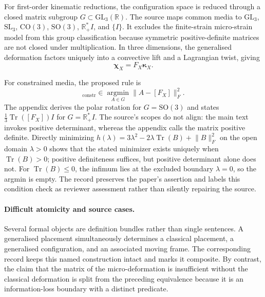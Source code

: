 For first-order kinematic reductions, the configuration space is reduced through a closed matrix subgroup $G\subset\mathrm{GL}_3(\mathbb R)$. The source maps common media to $\mathrm{GL}_3$, $\mathrm{SL}_3$, $\mathrm{CO}(3)$, $\mathrm{SO}(3)$, $\mathbb R_+^*I$, and $\{I\}$. It excludes the finite-strain micro-strain model from this group classification because symmetric positive-definite matrices are not closed under multiplication. In three dimensions, the generalised deformation factors uniquely into a convective lift and a Lagrangian twist, giving
\begin{equation}
\boldsymbol\chi_X=F_X\boldsymbol\kappa_X.
\end{equation}

For constrained media, the proposed rule is
\begin{equation}
[\boldsymbol\chi_X]_{\mathrm{constr}}
\in \underset{A\in G}{\operatorname{argmin}}
\lVert A-[F_X]\rVert_F^2.
\end{equation}
The appendix derives the polar rotation for $G=\mathrm{SO}(3)$ and states $\tfrac13\operatorname{Tr}([F_X])I$ for $G=\mathbb R_+^*I$. The source's scopes do not align: the main text invokes positive determinant, whereas the appendix calls the matrix positive definite. Directly minimizing $h(\lambda)=3\lambda^2-2\lambda\operatorname{Tr}(B)+\lVert B\rVert_F^2$ on the open domain $\lambda>0$ shows that the stated minimizer exists uniquely when $\operatorname{Tr}(B)>0$; positive definiteness suffices, but positive determinant alone does not. For $\operatorname{Tr}(B)\leq0$, the infimum lies at the excluded boundary $\lambda=0$, so the argmin is empty. The record preserves the paper's assertion and labels this condition check as reviewer assessment rather than silently repairing the source.

\paragraph{Difficult atomicity and source cases.}
Several formal objects are definition bundles rather than single sentences. A generalised placement simultaneously determines a classical placement, a generalised configuration, and an associated moving frame. The corresponding record keeps this named construction intact and marks it composite. By contrast, the claim that the matrix of the micro-deformation is insufficient without the classical deformation is split from the preceding equivalence because it is an information-loss boundary with a distinct predicate.

